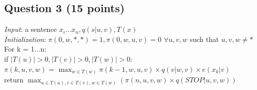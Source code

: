 \documentclass[11pt]{article}
\newcommand{\tab}{\hspace*{2em}}
\begin{document}
\subsection*{Question 3 (15 points)}
\begin{spacing}{2}
\begin{framed}
\emph{Input}: a sentence $x_i...x_n, q(s|u,v), T(x)$ \\
\emph{Initialization}: $\pi (0,w,*,*) = 1, \pi (0,w,u,v) = 0$ $\forall u,v,w$ such that $u,v,w \neq *$ \\
For k = 1...n: \\
\tab if $\left|{T(u)}\right| > 0, \left|{T(v)}\right| > 0, \left|{T(w)}\right| > 0 $: \\
\tab \tab $\pi(k,u,v,w)$ = $\max_{w \in T(w)}\pi(k-1, w, u, v)\times q(v|w,v) \times e(x_k | v)$ \\
return $\max_{u \in T(u), v \in T(v), w \in T(w)}(\pi(n,u,v,w) \times q(STOP|u,v,w))$
\end{framed}
\end{spacing}
\end{document}
